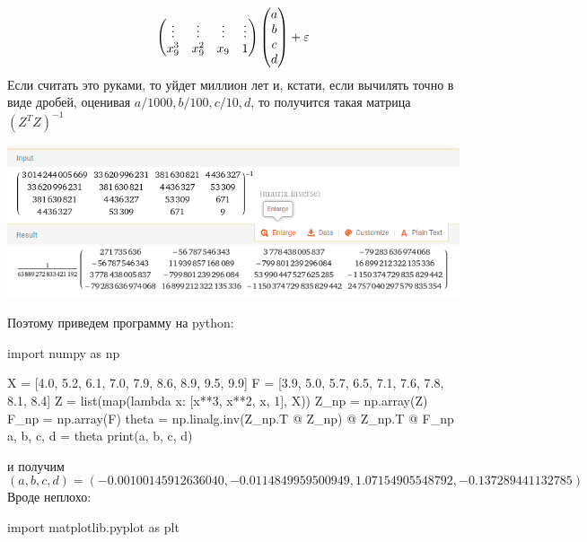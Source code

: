 {{\[\begin{pmatrix}
  \vdots & \vdots & \vdots & \vdots \\
  x_9^3 & x_9^2 & x_9 & 1
  \end{pmatrix}
  \begin{pmatrix}
  a \\ b \\ c \\ d
  \end{pmatrix} + \varepsilon
  \]
  Если считать это руками, то уйдет миллион лет и, кстати, если вычилять точно в виде дробей, оценивая $a/1000, b/100, c/10, d$, то получится такая матрица $(Z^TZ)^{-1}$
  \begin{center}
  \includegraphics[width=\textwidth]{pictures/29-1.png}
  \end{center}
  Поэтому приведем программу на python:
  \begin{python}
  import numpy as np

  X = [4.0, 5.2, 6.1, 7.0, 7.9, 8.6, 8.9, 9.5, 9.9]
  F = [3.9, 5.0, 5.7, 6.5, 7.1, 7.6, 7.8, 8.1, 8.4]
  Z = list(map(lambda x: [x**3, x**2, x, 1], X))
  Z_np = np.array(Z)
  F_np = np.array(F)
  theta = np.linalg.inv(Z_np.T @ Z_np) @ Z_np.T @ F_np
  a, b, c, d = theta
  print(a, b, c, d)
  \end{python} и получим 
  \[(a, b, c, d) = (-0.00100145912636040, -0.0114849959500949, 1.07154905548792, -0.137289441132785) \]
  Вроде неплохо:
  \begin{python}
  import matplotlib.pyplot as plt


\end{python}}}
